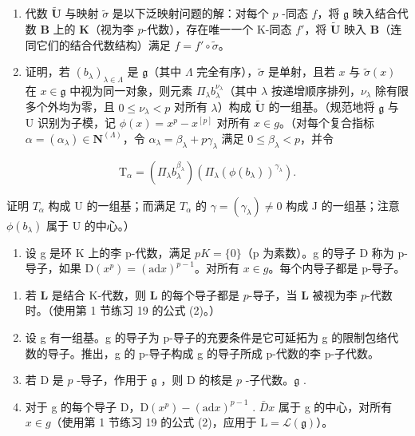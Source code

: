 \begin{enumerate}
\def\labelenumi{(\alph{enumi})}
\item
  代数 \(\tilde{\mathbf{U}}\) 与映射 \(\tilde{\sigma}\) 是以下泛映射问题的解：对每个 \(p\) -同态 \(f\)，将 \(\mathfrak{g}\) 映入结合代数 \(\mathbf{B}\) 上的 \(\mathbf{K}\)（视为李 \(p\)-代数），存在唯一一个 K-同态 \(f'\)，将 \(\tilde{\mathbf{U}}\) 映入 \(\mathbf{B}\)（连同它们的结合代数结构）满足 \(f = f' \circ \tilde{\sigma}\)。
\item
  证明，若 \((b_{\lambda})_{\lambda \in \Lambda}\) 是 \(\mathfrak{g}\)（其中 \(\Lambda\) 完全有序），\(\tilde{\sigma}\) 是单射，且若 \(x\) 与 \(\tilde{\sigma}(x)\) 在 \(x\in \mathfrak{g}\) 中视为同一对象，则元素 \(\Pi_{\lambda}b_{\lambda}^{\nu_{\lambda}}\)（其中 \(\lambda\) 按递增顺序排列，\(\nu_{\lambda}\) 除有限多个外均为零，且 \(0\leqslant \nu_{\lambda} < p\) 对所有 \(\lambda\)）构成 \(\tilde{\mathbf{U}}\) 的一组基。（规范地将 \(\mathfrak{g}\) 与 \(\mathrm{U}\) 识别为子模，记 \(\phi (x) = x^{p} - x^{[p]}\) 对所有 \(x\in g\)。（对每个复合指标 \(\alpha = (\alpha_{\lambda})\in \mathbf{N}^{(\Lambda)}\)，令 \(\alpha_{\lambda} = \beta_{\lambda} + p\gamma_{\lambda}\) 满足 \(0\leqslant \beta_{\lambda} < p\)，并令
\end{enumerate}

\[
\mathrm{T} _ {\alpha} = (\Pi_ {\lambda} b _ {\lambda} ^ {\beta_ {\lambda}}) (\Pi_ {\lambda} (\phi (b _ {\lambda})) ^ {\gamma_ {\lambda}}).
\]

证明 \(T_{\alpha}\) 构成 U 的一组基；而满足 \(T_{\alpha}\) 的 \(\gamma = (\gamma_{\lambda}) \neq 0\) 构成 J 的一组基；注意 \(\phi(b_{\lambda})\) 属于 U 的中心。）

\begin{enumerate}
\def\labelenumi{\arabic{enumi}.}
\setcounter{enumi}{6}
\tightlist
\item
  设 g 是环 K 上的李 p-代数，满足 \(pK = \{0\}\)（p 为素数）。g 的导子 D 称为 p-导子，如果 \(\mathrm{D}(x^{p}) = (\mathrm{ad} x)^{p-1}\)。对所有 \(x \in g\)。每个内导子都是 p-导子。
\end{enumerate}

\begin{enumerate}
\def\labelenumi{(\alph{enumi})}
\item
  若 \(\mathbf{L}\) 是结合 K-代数，则 \(\mathbf{L}\) 的每个导子都是 \(p\)-导子，当 \(\mathbf{L}\) 被视为李 \(p\)-代数时。（使用第 1 节练习 19 的公式 (2)。）
\item
  设 g 有一组基。g 的导子为 p-导子的充要条件是它可延拓为 g 的限制包络代数的导子。推出，g 的 p-导子构成 g 的导子所成 p-代数的李 p-子代数。
\item
  若 D 是 \(p\) -导子，作用于 \(\mathfrak{g}\) ，则 D 的核是 \(p\) -子代数。\(\mathfrak{g}\) .
\item
  对于 g 的每个导子 D，\(\mathrm{D}(x^{p}) - (\mathrm{ad} x)^{p-1}\) . \(\bar{D}x\) 属于 g 的中心，对所有 \(x \in g\)（使用第 1 节练习 19 的公式 (2)，应用于 \(\mathrm{L} = \mathcal{L}(\mathfrak{g})\)）。
\end{enumerate}

